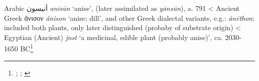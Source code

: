 \begin{etymology}\label{ety:anisun}
Arabic {أنيسون} \textit{anīsūn} `anise', (later assimilated as  \textit{yānsūn}), a. 791
< Ancient Greek {ἄνισον} \textit{ánison} `anise; dill', and other Greek dialectal variants, e.g.: \textit{ánēthon}; included both plants, only later distinguished (probaby of substrate origin)
< Egyptian (Ancient) \textit{jnst} `a medicinal, edible plant (probably anise)', ca. 2030-1650 BC\footnote{\textcite{wehr_dictionary_1976}; \textcite{liddell_greek-english_1940}; \textcites[99]{erman_worterbuch_1926}[240]{hemmerdinger_noms_1968}}
\end{etymology}
